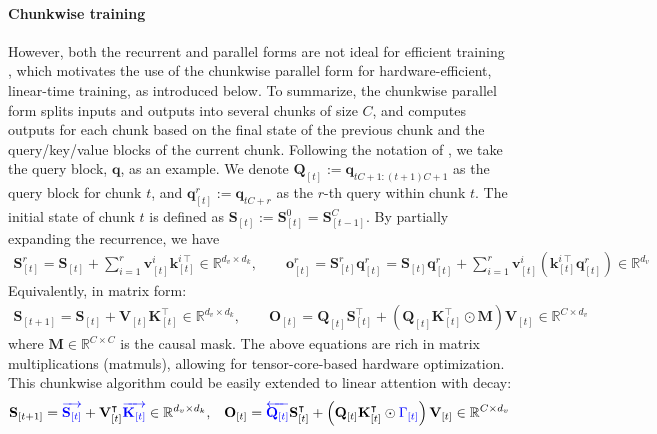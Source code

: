 \documentclass{article}
\def\rmK{{\mathbf{K}}}
\def\rmM{{\mathbf{M}}}
\def\rmO{{\mathbf{O}}}
\def\rmQ{{\mathbf{Q}}}
\def\rmS{{\mathbf{S}}}
\def\rmV{{\mathbf{V}}}
\def\vk{{\bm{k}}}
\def\vo{{\bm{o}}}
\def\vq{{\bm{q}}}
\def\vv{{\bm{v}}}
\begin{document}
\paragraph{Chunkwise training} 
 However, both the recurrent and parallel forms are not ideal for efficient training \citep{hua_transformer_2022,yang_gated_2023}, which motivates the use of the chunkwise parallel form \citep{hua_transformer_2022, sun2023retentive} for hardware-efficient, linear-time training, as introduced below.
To summarize, the chunkwise parallel form splits inputs and outputs into several chunks of size \( C \), and computes outputs for each chunk based on the final state of the previous chunk and the query/key/value blocks of the current chunk. Following the notation of \citet{sun_retentive_2023, yang_gated_2023, yang2024parallelizing}, we take the query block, \(\vq\), as an example. We denote \(\rmQ_{[t]} := \vq_{tC+1:(t+1)C+1}\) as the query block for chunk \( t \), and \(\vq_{[t]}^r := \vq_{tC+r}\) as the \( r \)-th query within chunk \( t \). The initial state of chunk \( t \) is defined as \(\rmS_{[t]} := \rmS_{[t]}^0 = \rmS_{[t-1]}^C\). By partially expanding the recurrence, we have
\vspace{-3mm}
\begin{align*}
     \rmS_{[t]}^r = \rmS_{[t]} + \sum_{i=1}^r \vv_{[t]}^{i} \vk_{[t]}^{i\intercal} \in \mathbb{R}^{d_v\times d_k}, \qquad 
     \vo_{[t]}^r = \rmS_{[t]}^r\vq_{[t]}^r = \rmS_{[t]}\vq_{[t]}^r + \sum_{i=1}^r \vv_{[t]}^{i} \left(\vk_{[t]}^{i\intercal} \vq_{[t]}^{r} \right)  \in \mathbb{R}^{d_v}
 \end{align*}
 \vspace{-3mm}
Equivalently, in matrix form:
\vspace{1mm}
\begin{align*}
\rmS_{[t+1]} = \rmS_{[t]} + \rmV_{[t]} \rmK_{[t]}^\intercal \in \mathbb{R}^{d_v \times d_k}, \qquad 
\rmO_{[t]} = \rmQ_{[t]} \rmS_{[t]}^\intercal  + \left(\rmQ_{[t]}\rmK_{[t]}^\intercal \odot \rmM\right) \rmV_{[t]}  \in \mathbb{R}^{C \times d_v}
\end{align*}
where \(\rmM \in \mathbb{R}^{C\times C}\) is the causal mask. The above equations are rich in matrix multiplications (matmuls), allowing for tensor-core-based hardware optimization.
This chunkwise algorithm could be easily extended to linear attention with decay:
\begin{align}
    \rmS_{[t+1]} = {\color{blue}
\overrightarrow{\rmS_{[t]}}}
+ \rmV_{[t]}^\intercal 
    {\color{blue}
\overrightarrow{\rmK_{[t]}}} \in \mathbb{R}^{d_v \times d_k} 
,  && 
    \rmO_{[t]} = {\color{blue}{\overleftarrow{ \rmQ_{[t]}}}} \rmS_{[t]}^\intercal + \left(\rmQ_{[t]} \rmK_{[t]}^\intercal \odot {\color{blue}\Gamma_{[t]}}\right)\rmV_{[t]} \in \mathbb{R}^{C\times d_v}
    \label{eq:mamba2-update-o}
\end{align}
\end{document}
